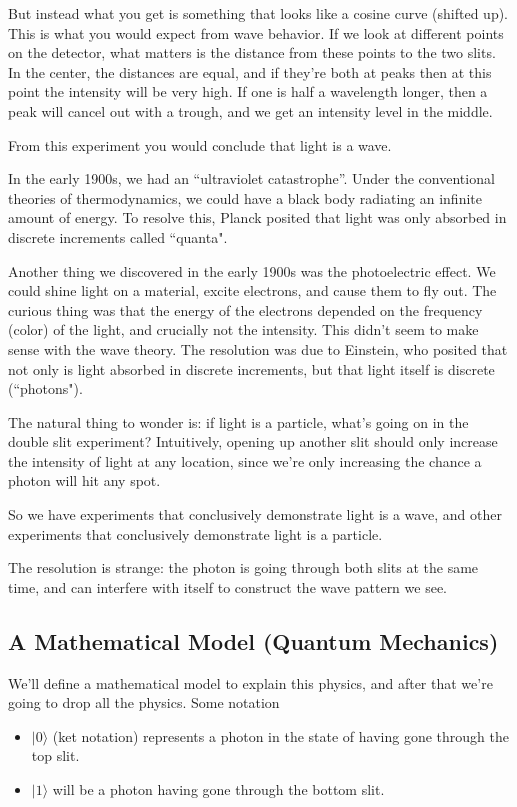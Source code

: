 But instead what you get is something that looks like a cosine curve (shifted up). This is what you would expect from wave behavior. If we look at different points on the detector, what matters is the distance from these points to the two slits. In the center, the distances are equal, and if they're both at peaks then at this point the intensity will be very high. If one is half a wavelength longer, then a peak will cancel out with a trough, and we get an intensity level in the middle. 

From this experiment you would conclude that light is a wave.

In the early 1900s, we had an ``ultraviolet catastrophe''. Under the conventional theories of thermodynamics, we could have a black body radiating an infinite amount of energy. To resolve this, Planck posited that light was only absorbed in discrete increments called ``quanta". 

Another thing we discovered in the early 1900s was the photoelectric effect. We could shine light on a material, excite electrons, and cause them to fly out. The curious thing was that the energy of the electrons depended on the frequency (color) of the light, and crucially not the intensity. This didn't seem to make sense with the wave theory. The resolution was due to Einstein, who posited that not only is light absorbed in discrete increments, but that light itself is discrete (``photons"). 

The natural thing to wonder is: if light is a particle, what's going on in the double slit experiment? Intuitively, opening up another slit should only increase the intensity of light at any location, since we're only increasing the chance a photon will hit any spot.

So we have experiments that conclusively demonstrate light is a wave, and other experiments that conclusively demonstrate light is a particle.

The resolution is strange: the photon is going through both slits at the same time, and can interfere with itself to construct the wave pattern we see.

\subsection{A Mathematical Model (Quantum Mechanics)}

We'll define a mathematical model to explain this physics, and after that we're going to drop all the physics. Some notation
\begin{itemize}
\item $| 0 \rangle$ (ket notation) represents a photon in the state of having gone through the top slit.
\item $| 1 \rangle$ will be a photon having gone through the bottom slit. 
\end{itemize}

